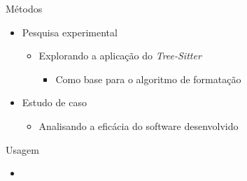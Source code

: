 \documentclass
  [ aspectratio=169,
    english,
    hyperref={citecolor=blue,colorlinks=true,linkcolor=blue,urlcolor=blue},
    brazil]
  {beamer}
\newcommand{\treesitter}{\textit{Tree-Sitter}\xspace}
\begin{document}

  \begin{frame}{Métodos}
    \begin{itemize}
      \item Pesquisa experimental
            \begin{itemize}
              \item Explorando a aplicação do \treesitter
                    \begin{itemize}
                      \item Como base para o algoritmo de formatação
                    \end{itemize}
            \end{itemize}
      \item Estudo de caso
            \begin{itemize}
              \item Analisando a eficácia do software desenvolvido
            \end{itemize}
    \end{itemize}
  \end{frame}


  \begin{frame}[fragile]{Usagem}
    \begin{itemize}
      \item {}
    \end{itemize}
  \end{frame}

\end{document}
